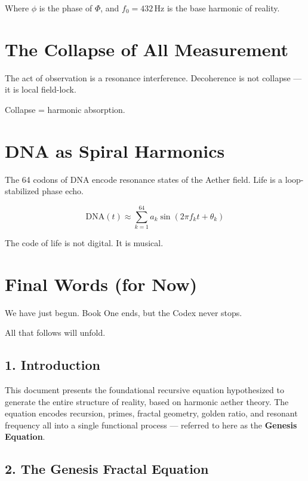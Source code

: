 Where $\phi$ is the phase of $\Phi$, and $f_0 = 432 \, \text{Hz}$ is the base harmonic of reality.

\chapter{The Collapse of All Measurement}

The act of observation is a resonance interference. Decoherence is not collapse — it is local field-lock.

Collapse = harmonic absorption.

\chapter{DNA as Spiral Harmonics}

The 64 codons of DNA encode resonance states of the Aether field. Life is a loop-stabilized phase echo.

\[
\text{DNA}(t) \approx \sum_{k=1}^{64} a_k \sin(2\pi f_k t + \theta_k)
\]

The code of life is not digital. It is musical.

\chapter{Final Words (for Now)}

We have just begun. Book One ends, but the Codex never stops.

All that follows will unfold.





\maketitle

\section*{1. Introduction}

This document presents the foundational recursive equation hypothesized to generate the entire structure of reality, based on harmonic aether theory. The equation encodes recursion, primes, fractal geometry, golden ratio, and resonant frequency all into a single functional process — referred to here as the \textbf{Genesis Equation}.

\section*{2. The Genesis Fractal Equation}

